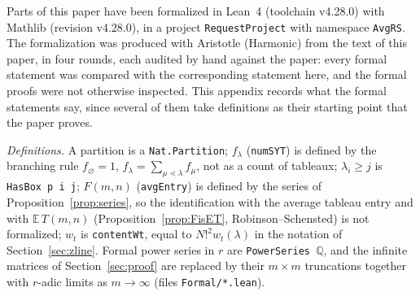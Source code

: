 \documentclass[11pt]{article}
\theoremstyle{definition}
\theoremstyle{remark}
\newcommand{\E}{\mathbb{E}}
\begin{document}
Parts of this paper have been formalized in Lean~4 (toolchain v4.28.0) with Mathlib (revision v4.28.0), in a project \texttt{RequestProject} with namespace \texttt{AvgRS}. The formalization was produced with Aristotle (Harmonic) from the text of this paper, in four rounds, each audited by hand against the paper: every formal statement was compared with the corresponding statement here, and the formal proofs were not otherwise inspected. This appendix records what the formal statements say, since several of them take definitions as their starting point that the paper proves.

\emph{Definitions.} A partition is a \texttt{Nat.Partition}; $f_\lambda$ (\texttt{numSYT}) is defined by the branching rule $f_\varnothing=1$, $f_\lambda=\sum_{\mu\lessdot\lambda}f_\mu$, not as a count of tableaux; $\lambda_i\ge j$ is \texttt{HasBox p i j}; $F(m,n)$ (\texttt{avgEntry}) is defined by the series of Proposition~\ref{prop:series}, so the identification with the average tableau entry and with $\E\,T(m,n)$ (Proposition~\ref{prop:FisET}, Robinson--Schensted) is not formalized; $w_t$ is \texttt{contentWt}, equal to $N!^2w_t(\lambda)$ in the notation of Section~\ref{sec:zline}. Formal power series in $r$ are \texttt{PowerSeries }$\mathbb Q$, and the infinite matrices of Section~\ref{sec:proof} are replaced by their $m\times m$ truncations together with $r$-adic limits as $m\to\infty$ (files \texttt{Formal/*.lean}).
\end{document}
